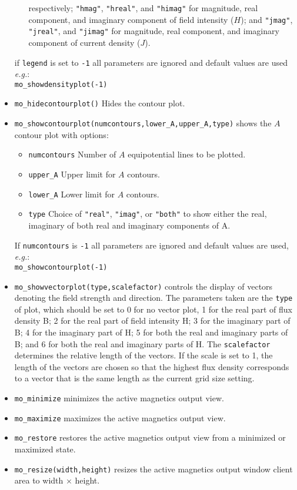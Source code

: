 \begin{itemize}
\begin{itemize}
        respectively; {\tt "hmag"}, {\tt "hreal"}, and {\tt "himag"} for
        magnitude, real component, and imaginary component of field intensity ($H$);
		and {\tt "jmag"}, {\tt "jreal"}, and {\tt "jimag"} for
        magnitude, real component, and imaginary component of current density ($J$).
        \end{itemize}
        if {\tt legend} is set to {\tt -1} all parameters are ignored and default values are
        used {\em e.g.}: \\ \verb+mo_showdensityplot(-1)+
\item{\verb+mo_hidecontourplot()+} Hides the contour plot.
\item{\verb+mo_showcontourplot(numcontours,lower_A,upper_A,type)+}
shows the $A$ contour plot with options:
        \begin{itemize}
        \item{\tt numcontours} Number of $A$ equipotential lines
        to be plotted.
        \item{\verb+upper_A+} Upper limit for $A$ contours.
        \item{\verb+lower_A+} Lower limit for $A$ contours.
                \item{\verb+type+} Choice of {\tt "real"}, {\tt "imag"}, or {\tt "both"}
                        to show either the real, imaginary of both real and imaginary components of A.
        \end{itemize}
        If {\tt numcontours} is {\tt -1} all parameters are ignored and default
        values are used, {\em e.g.}: \\ \verb+mo_showcontourplot(-1)+

\item{\tt mo\_showvectorplot(type,scalefactor)}
controls the display of vectors denoting the field strength and
direction. The parameters taken are the \texttt{type} of plot,
which should be set to 0 for no vector plot,  1 for the real part of flux density B;
2 for the real part of field intensity H; 3 for the imaginary part of B;
4 for the imaginary part of H; 5 for both the real and imaginary parts of B;
and 6 for both the real and imaginary parts of H. The \texttt{scalefactor}
determines the relative length of the vectors. If the scale is set
to 1, the length of the vectors are chosen so that the highest flux
density corresponds to a vector that is the same length as the
current grid size setting.


\item{\tt mo\_minimize} minimizes the active magnetics output view.
\item{\tt mo\_maximize} maximizes the active magnetics output view.
\item{\tt mo\_restore} restores the active magnetics output view from a
 minimized or maximized state.
\item{\tt mo\_resize(width,height)} resizes the active magnetics output
 window client area to width $\times$ height.
\end{itemize}

